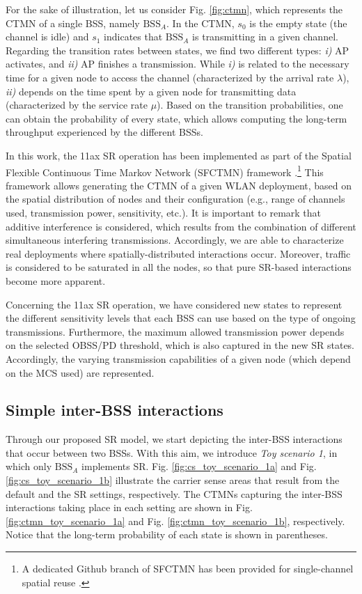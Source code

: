 \documentclass{article}
\begin{document}
For the sake of illustration, let us consider Fig. \ref{fig:ctmn}, which represents the CTMN of a single BSS, namely $\text{BSS}_A$. In the CTMN, $s_0$ is the empty state (the channel is idle) and $s_1$ indicates that $\text{BSS}_A$ is transmitting in a given channel. Regarding the transition rates between states, we find two different types: \emph{i)} AP activates, and \emph{ii)} AP finishes a transmission. While \emph{i)} is related to the necessary time for a given node to access the channel (characterized by the arrival rate $\lambda$), \emph{ii)} depends on the time spent by a given node for transmitting data (characterized by the service rate $\mu$). Based on the transition probabilities, one can obtain the probability of every state, which allows computing the long-term throughput experienced by the different BSSs.

In this work, the 11ax SR operation has been implemented as part of the Spatial Flexible Continuous Time Markov Network (SFCTMN) framework \cite{barrachina2019dynamic, barrachina2019overlap, wilhelmi2019potential}.\footnote{A dedicated Github branch of SFCTMN has been provided for single-channel spatial reuse \cite{wilhelmi2019sfctm_spatial_reuse}.} This framework allows generating the CTMN of a given WLAN deployment, based on the spatial distribution of nodes and their configuration (e.g., range of channels used, transmission power, sensitivity, etc.). It is important to remark that additive interference is considered, which results from the combination of different simultaneous interfering transmissions. Accordingly, we are able to characterize real deployments where spatially-distributed interactions occur. Moreover, traffic is considered to be saturated in all the nodes, so that pure SR-based interactions become more apparent.

Concerning the 11ax SR operation, we have considered new states to represent the different sensitivity levels that each BSS can use based on the type of ongoing transmissions. Furthermore, the maximum allowed transmission power depends on the selected OBSS/PD threshold, which is also captured in the new SR states. Accordingly, the varying transmission capabilities of a given node (which depend on the MCS used) are represented.

\subsection{Simple inter-BSS interactions}
\label{section:simple_interactions}
Through our proposed SR model, we start depicting the inter-BSS interactions that occur between two BSSs. With this aim, we introduce \emph{Toy scenario 1}, in which only $\text{BSS}_A$ implements SR. Fig. \ref{fig:cs_toy_scenario_1a} and Fig. \ref{fig:cs_toy_scenario_1b} illustrate the carrier sense areas that result from the default and the SR settings, respectively. The CTMNs capturing the inter-BSS interactions taking place in each setting are shown in Fig. \ref{fig:ctmn_toy_scenario_1a} and Fig. \ref{fig:ctmn_toy_scenario_1b}, respectively. Notice that the long-term probability of each state is shown in parentheses.
\end{document}
